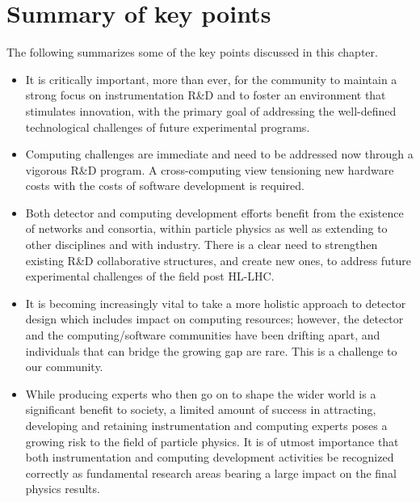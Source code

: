 \newpage
\section{Summary of key points}

The following summarizes some of the key points discussed in this chapter.

\begin{itemize}
    \item It is critically important, more than ever, for the community to maintain a strong focus on instrumentation R\&D and to foster an environment that stimulates innovation, with the primary goal of addressing the well-defined technological challenges of future experimental programs. 
    
    \item Computing challenges are immediate and need to be addressed now through a vigorous R\&D program. A cross-computing view tensioning new hardware costs with the costs of software development is required.
    
    \item Both detector and computing development efforts benefit from the existence of networks and  consortia, within particle physics as well as extending to other disciplines and with industry.
    There is a clear need to strengthen existing R\&D collaborative structures, and create new ones, to address future experimental challenges of the field post HL-LHC.
    
    
    \item It is becoming increasingly vital to take a more holistic approach to detector design which includes impact on computing resources; however, the detector and the computing/software communities have been drifting apart, and individuals that can bridge the growing gap are rare. This is a challenge to our community. 

    \item While producing experts who then go on to shape the wider world is a significant benefit to society,  %
    a limited amount of success in attracting, developing and retaining instrumentation and computing experts poses a growing risk to the field of particle physics.  It is of utmost importance that both instrumentation and computing development activities be recognized correctly as fundamental research areas bearing a large impact on the final physics results.


    
    
    
\end{itemize}
\vfill